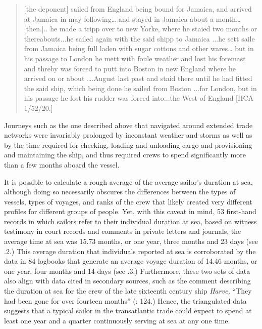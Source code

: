  
\begin{quotation}
[the deponent] sailed from England being bound for Jamaica, and arrived at Jamaica in may following… and stayed in Jamaica about a month…[then.].. he made a tripp over to new Yorke, where he staied two months or thereabouts...he sailed again with the said shipp to Jamaica ...he sett saile from Jamaica being full laden with sugar cottons and other wares… but in his passage to London he mett with foule weather and lost his foremast and threby was forced to putt into Boston in new England where he arrived on or about ….August last past and staid there until he had fitted the said ship, which being done he sailed from Boston ...for London, but in his passage he lost his rudder was forced into...the West of England [HCA 1/52/20.]\end{quotation}

Journeys such as the one described above that navigated around extended trade networks were invariably prolonged by inconstant weather and storms as well as by the time required for  checking, loading and unloading cargo and provisioning and maintaining the ship, and thus required crews to spend significantly more than a few months aboard the vessel. 

It is possible to calculate a rough average of the average sailor’s duration at sea, although doing so necessarily obscures the differences between the types of vessels, types of voyages, and ranks of the crew that likely created very different profiles for different groups of people. Yet, with this caveat in mind, 53 first-hand records in which sailors refer to their individual duration at sea, based on witness testimony in court records and comments in private letters and journals, the average time at sea was 15.73 months, or one year, three months and 23 days (see .2.) This average duration that individuals reported at sea is corroborated by the data in 84 logbooks that generate an average voyage duration of 14.46 months, or one year, four months and 14 days (see .3.) Furthermore, these two sets of data also align with data cited in secondary sources, such as the comment describing the duration at sea for the crew of the late sixteenth century ship \textit{Harve,} “They had been gone for over fourteen months” (\citealt{Bicheno2012}: 124.) Hence, the triangulated data suggests that a typical sailor in the transatlantic trade could expect to spend at least one year and a quarter continuously serving at sea at any one time. 

